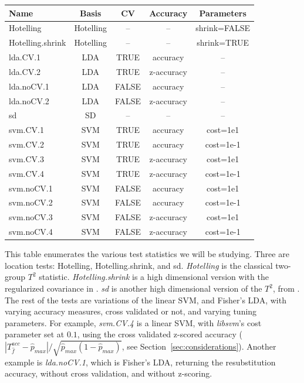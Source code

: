 \documentclass[12pt,a4paper]{article}
\newcommand{\hyp}{f} %
\newcommand{\hypEstim}{\hat{\hyp}} %
\newcommand{\acc}{T^{acc}}
\newcommand{\dominant}{\hat{p}_{max}}
\begin{document}
\begin{tcolorbox}
\centering
\begin{tabular}{l|c|c|c|c}
Name & Basis & CV & Accuracy & Parameters\\ 
\hline
\hline
Hotelling & Hotelling & -- & -- & shrink=FALSE\\ 
Hotelling.shrink & Hotelling & -- & -- & shrink=TRUE \\ 
lda.CV.1 & LDA & TRUE & accuracy &  -- \\ 
lda.CV.2 & LDA & TRUE & z-accuracy & -- \\ 
lda.noCV.1 & LDA & FALSE & accuracy &  --\\ 
lda.noCV.2 & LDA & FALSE & z-accuracy &  --\\ 
sd & SD & -- & -- & -- \\ 
svm.CV.1 & SVM & TRUE & accuracy & cost=1e1 \\ 
svm.CV.2 & SVM & TRUE & accuracy & cost=1e-1 \\ 
svm.CV.3 & SVM & TRUE & z-accuracy & cost=1e1 \\ 
svm.CV.4 & SVM & TRUE & z-accuracy & cost=1e-1 \\ 
svm.noCV.1 & SVM & FALSE & accuracy & cost=1e1 \\ 
svm.noCV.2 & SVM & FALSE & accuracy & cost=1e-1 \\ 
svm.noCV.3 & SVM & FALSE & z-accuracy & cost=1e1 \\ 
svm.noCV.4 & SVM & FALSE & z-accuracy & cost=1e-1 \\
\end{tabular} 
\captionsetup{type=table}
\caption{\footnotesize
This table enumerates the various test statistics we will be studying. 
Three are location tests: Hotelling, Hotelling.shrink, and sd.
\textit{Hotelling} is the classical two-group $T^2$ statistic. 
\textit{Hotelling.shrink} is a high dimensional version with the regularized covariance in \cite{schafer_shrinkage_2005}. 
\textit{sd} is another high dimensional version of the $T^2$, from \cite{srivastava_two_2013}. 
The rest of the tests are variations of the linear SVM, and Fisher's LDA, with varying accuracy measures, cross validated or not, and varying tuning parameters. 
For example, \textit{svm.CV.4} is a linear SVM, with \textit{libsvm}'s cost parameter set at $0.1$, using the cross validated z-scored accuracy ($|\acc_{\hypEstim}-\dominant|/\sqrt{\dominant(1-\dominant)}$, see Section~\ref{sec:considerations}).
Another example is \textit{lda.noCV.1}, which is Fisher's LDA, returning the resubstitution accuracy, without cross validation, and without z-scoring.}
\label{tab:collected}
\end{tcolorbox}
\end{document}
